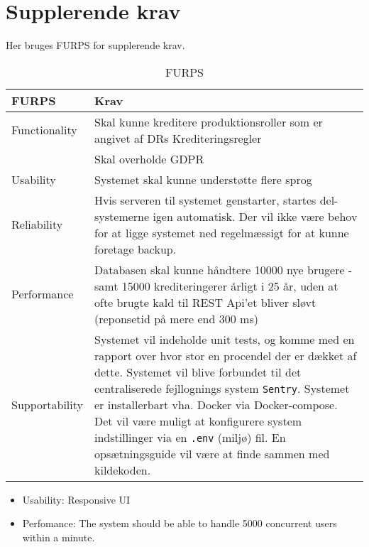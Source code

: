 \section{Supplerende krav}

Her bruges FURPS for supplerende krav.
\begin{table}[H]
    \centering
    \begin{tabular}{|p{3cm}|p{13cm}|}
    \hline
    \textbf{FURPS}           &    \textbf{Krav} \\
    \hline
    Functionality           & Skal kunne kreditere produktionsroller som er angivet af DRs Krediteringsregler \\
                            & Skal overholde GDPR \\
    \hline
    Usability       & Systemet skal kunne understøtte flere sprog \\
    \hline
    Reliability     &  Hvis serveren til systemet genstarter, startes del-systemerne igen automatisk. Der vil ikke være behov for at ligge systemet ned regelmæssigt for at kunne foretage backup. \\
    \hline
    Performance     &  Databasen skal kunne håndtere 10000 nye brugere - samt 15000 krediteringerer årligt i 25 år, uden at ofte brugte kald til REST Api'et bliver sløvt (reponsetid på mere end 300 ms) \\
    \hline
    Supportability  &  Systemet vil indeholde unit tests, og komme med en rapport over hvor stor en procendel der er dækket af dette. %
    Systemet vil blive forbundet til det centraliserede fejllognings system \texttt{Sentry}.
    Systemet er installerbart vha. Docker via Docker-compose. %
    Det vil være muligt at konfigurere system indstillinger via en \texttt{.env} (miljø) fil.
    En opsætningsguide vil være at finde sammen med kildekoden. 
    \\ \hline
    \end{tabular}
    \caption{FURPS}
    \label{tab:furps}
\end{table} 


\begin{itemize}
    \item Usability: Responsive UI
    \item Perfomance: The system should be able to handle 5000 concurrent users within a minute.
\end{itemize}
